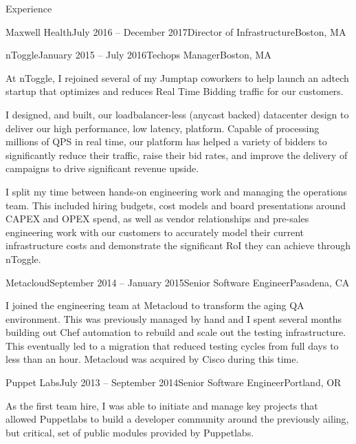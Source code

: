 \documentclass{resume} %
\begin{document}
\begin{rSection}{Experience}
\begin{rSubsection}{Maxwell Health}{July 2016 -- December 2017}{Director of Infrastructure}{Boston, MA}
\end{rSubsection}

\begin{rSubsection}{nToggle}{January 2015 -- July 2016}{Techops Manager}{Boston, MA}

\item[] At nToggle, I rejoined several of my Jumptap coworkers to help launch
  an adtech startup that optimizes and reduces Real Time Bidding traffic for
  our customers.

I designed, and built, our loadbalancer-less (anycast backed) datacenter design
  to deliver our high performance, low latency, platform.  Capable of
  processing millions of QPS in real time, our platform has helped a variety of
  bidders to significantly reduce their traffic, raise their bid rates, and
  improve the delivery of campaigns to drive significant revenue upside.  

I split my time between hands-on engineering work and managing the operations
  team.  This included hiring budgets, cost models and board presentations
  around CAPEX and OPEX spend, as well as vendor relationships and pre-sales
  engineering work with our customers to accurately model their current
  infrastructure costs and demonstrate the significant RoI they can achieve
  through nToggle.

\end{rSubsection}

\begin{rSubsection}{Metacloud}{September 2014 -- January 2015}{Senior Software Engineer}{Pasadena, CA}

\item[] I joined the engineering team at Metacloud to transform the aging QA
  environment.  This was previously managed by hand and I spent several months
  building out Chef automation to rebuild and scale out the testing
  infrastructure.  This eventually led to a migration that reduced testing
  cycles from full days to less than an hour.  Metacloud was acquired by Cisco
  during this time.

\end{rSubsection}

\begin{rSubsection}{Puppet Labs}{July 2013 -- September 2014}{Senior Software Engineer}{Portland, OR}

\item[] As the first team hire, I was able to initiate and manage key projects
  that allowed Puppetlabs to build a developer community around the previously
  ailing, but critical, set of public modules provided by Puppetlabs.


\end{rSubsection}
\end{rSection}
\end{document}
